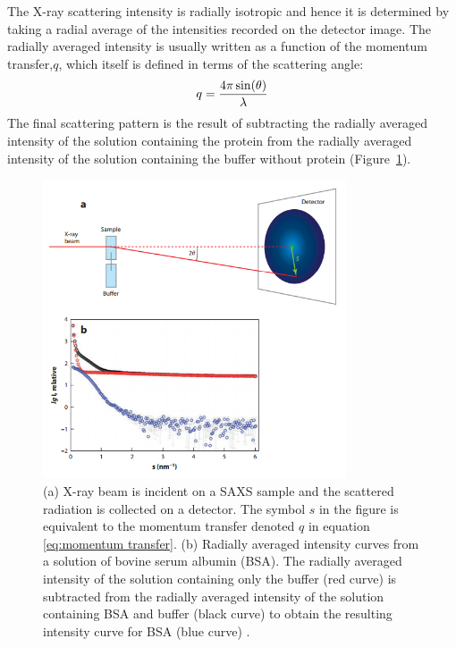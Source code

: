     The X-ray scattering intensity is radially isotropic and hence it is determined by taking a radial average of the intensities recorded on the detector image\cite{franke2015correlation}.
    The radially averaged intensity is usually written as a function of the momentum transfer,$q$, which itself is defined in terms of the scattering angle:
    \begin{equation}
        q = \frac{4 \pi \sin(\theta)}{\lambda}
        \label{eq:momentum transfer}
    \end{equation}
    The final scattering pattern is the result of subtracting the radially averaged intensity of the solution containing the protein from the radially averaged intensity of the solution containing the buffer without protein (Figure~\ref{fig:SAXS scattering curve}).
    \begin{figure}
        \centering
        \includegraphics[width=0.8\textwidth]{figures/introduction/SAXS_scattering.png}
        \caption[SAXS data collection schematic and resulting radially averaged intensity curve.]{(a) X-ray beam is incident on a SAXS sample and the scattered radiation is collected on a detector.
        The symbol $s$ in the figure is equivalent to the momentum transfer denoted $q$ in equation \ref{eq:momentum transfer}.
        (b) Radially averaged intensity curves from a solution of bovine serum albumin (BSA).
        The radially averaged intensity of the solution containing only the buffer (red curve) is subtracted from the radially averaged intensity of the solution containing BSA and buffer (black curve) to obtain the resulting intensity curve for BSA (blue curve) \cite{blanchet2013small}.}
        \label{fig:SAXS scattering curve}
    \end{figure}

